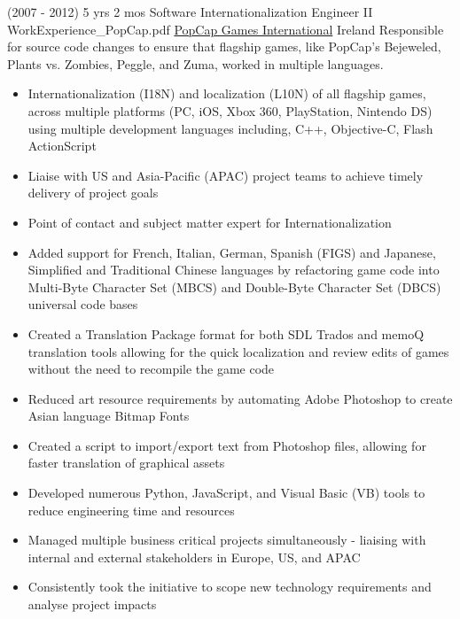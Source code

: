 
\begin{twenty}
\twentyitem
  {(2007 - 2012) 5 yrs 2 mos}
  {Software Internationalization Engineer II}
  {WorkExperience_PopCap.pdf}
  {\href{https://www.popcap.com/}{PopCap Games International}}
  {Ireland}
  {Responsible for source code changes to ensure that flagship games, like PopCap's Bejeweled, Plants vs. Zombies, Peggle, and Zuma, worked in multiple languages.}
  {\begin{itemize}
    \item Internationalization (I18N) and localization (L10N) of all flagship games, across multiple platforms (PC, iOS, Xbox 360, PlayStation, Nintendo DS) using multiple development languages including, C++, Objective-C, Flash ActionScript
    \item Liaise with US and Asia-Pacific (APAC) project teams to achieve timely delivery of project goals
    \item Point of contact and subject matter expert for Internationalization
  \end{itemize}
  }
  {\begin{itemize}
    \item Added support for French, Italian, German, Spanish (FIGS) and Japanese, Simplified and Traditional Chinese languages by refactoring game code into Multi-Byte Character Set (MBCS) and Double-Byte Character Set (DBCS) universal code bases
    \item Created a Translation Package format for both SDL Trados and memoQ translation tools allowing for the quick localization and review edits of games without the need to recompile the game code
    \item Reduced art resource requirements by automating Adobe Photoshop to create Asian language Bitmap Fonts
    \item Created a script to import/export text from Photoshop files, allowing for faster translation of graphical assets
    \item Developed numerous Python, JavaScript, and Visual Basic (VB) tools to reduce engineering time and resources
    \item Managed multiple business critical projects simultaneously - liaising with internal and external stakeholders in Europe, US, and APAC
    \item Consistently took the initiative to scope new technology requirements and analyse project impacts
  \end{itemize}
  }
\end{twenty}

